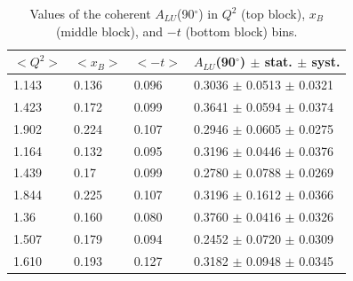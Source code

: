 \documentclass{article}
\begin{document}
\begin{table}[!h]
   \begin{center}
      \begin{tabular}{||l|l|l|l||}
         \hline
 $<Q^{2}>$ & $<x_{B}>$ & $<-t>$ & $A_{LU}$(90$^{\circ}$) $\pm$ stat. $\pm$ syst.\\
  \hline
  1.143 & 0.136 & 0.096 &  0.3036 $\pm$ 0.0513 $\pm$ 0.0321\\
  1.423 & 0.172 & 0.099 &  0.3641 $\pm$ 0.0594 $\pm$ 0.0374\\
  1.902 & 0.224 & 0.107 &  0.2946 $\pm$ 0.0605 $\pm$ 0.0275\\
  \hline                   
  1.164 & 0.132 & 0.095 &  0.3196 $\pm$ 0.0446 $\pm$ 0.0376\\
  1.439 & 0.17  & 0.099 &  0.2780 $\pm$ 0.0788 $\pm$ 0.0269\\
  1.844 & 0.225 & 0.107 &  0.3196 $\pm$ 0.1612 $\pm$ 0.0366\\
  \hline                   
  1.36  & 0.160 & 0.080 &  0.3760 $\pm$ 0.0416 $\pm$ 0.0326\\
  1.507 & 0.179 & 0.094 &  0.2452 $\pm$ 0.0720 $\pm$ 0.0309\\
  1.610 & 0.193 & 0.127 &  0.3182 $\pm$ 0.0948 $\pm$ 0.0345\\
  \hline
  \end{tabular}
  \caption{Values of the coherent $A_{LU}$(90$^{\circ}$) in $Q^2$ (top block), $x_B$ (middle block), and $-t$ (bottom block) bins. }
  \label{table:Coh_BSA_90}
  \end{center}
\end{table}

\end{document}
